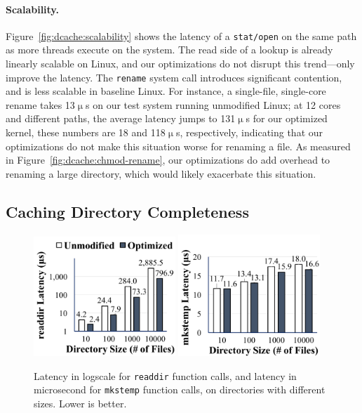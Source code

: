 \paragraph{Scalability.}
Figure~\ref{fig:dcache:scalability} shows the latency of a {\tt stat/open} on the same path as more threads execute on the system.  
The read side of a lookup is already linearly scalable on Linux, and our optimizations do not disrupt this trend---only improve the latency.
The {\tt rename} system call introduces significant contention, and is less scalable in baseline Linux.
For instance, a single-file, single-core rename takes 13$\upmu$s 
on our test system running unmodified Linux; 
at 12 cores and different paths, the average latency jumps to 131$\upmu$s
for our optimized kernel, these numbers are 18 and 118$\upmu$s, respectively, indicating that 
our optimizations do not make this situation worse for renaming a file.
As measured in Figure~\ref{fig:dcache:chmod-rename},
our optimizations do add overhead to renaming a large directory, which would likely exacerbate this situation.

\subsection{Caching Directory Completeness}

\begin{figure}
\scriptsize
\centering
\includegraphics[width=2.1in]{dcache/plots/lm_readdir.pdf}
\hspace{1in}
\includegraphics[width=2.1in]{dcache/plots/lm_mkstemp.pdf}
\caption[The optimized {\tt readdir} and {\tt mkstemp} latency.]
{Latency in logscale for {\tt readdir} function calls, and latency in microsecond for {\tt mkstemp} function calls, on directories with different sizes. Lower is better. }
\label{fig:dcache:readdir}
\end{figure}

